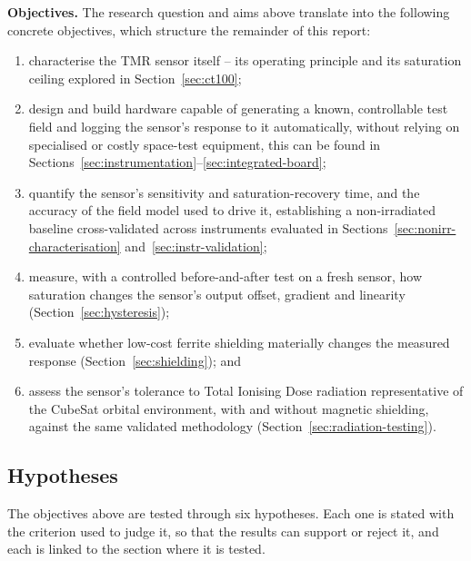 \documentclass[12pt,a4paper]{article}
\begin{document}
\textbf{Objectives.} The research question and aims above translate into the following concrete objectives, which structure the remainder of this report:
\begin{enumerate}[label=(\roman*)]
\item characterise the TMR sensor itself -- its operating principle and its saturation ceiling explored in Section~\ref{sec:ct100};
\item design and build hardware capable of generating a known, controllable test field and logging the sensor's response to it automatically, without relying on specialised or costly space-test equipment, this can be found in Sections~\ref{sec:instrumentation}--\ref{sec:integrated-board};
\item quantify the sensor's sensitivity and saturation-recovery time, and the accuracy of the field model used to drive it, establishing a non-irradiated baseline cross-validated across instruments evaluated in Sections~\ref{sec:nonirr-characterisation} and~\ref{sec:instr-validation};
\item measure, with a controlled before-and-after test on a fresh sensor, how saturation changes the sensor's output offset, gradient and linearity (Section~\ref{sec:hysteresis});
\item evaluate whether low-cost ferrite shielding materially changes the measured response (Section~\ref{sec:shielding}); and
\item assess the sensor's tolerance to Total Ionising Dose radiation representative of the CubeSat orbital environment, with and without magnetic shielding, against the same validated methodology (Section~\ref{sec:radiation-testing}).
\end{enumerate}

\subsection{Hypotheses}
\label{sec:hypotheses}

The objectives above are tested through six hypotheses. Each one is stated with the criterion used to judge it, so that the results can support or reject it, and each is linked to the section where it is tested. 
\end{document}
